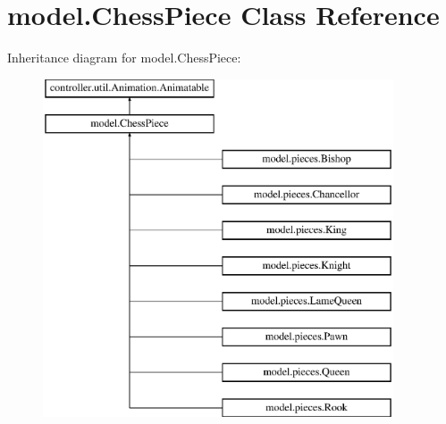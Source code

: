 \hypertarget{classmodel_1_1_chess_piece}{\section{model.\-Chess\-Piece Class Reference}
\label{classmodel_1_1_chess_piece}
}
Inheritance diagram for model.\-Chess\-Piece\-:\begin{figure}[H]
\begin{center}
\leavevmode
\includegraphics[height=10.000000cm]{classmodel_1_1_chess_piece}
\end{center}
\end{figure}
